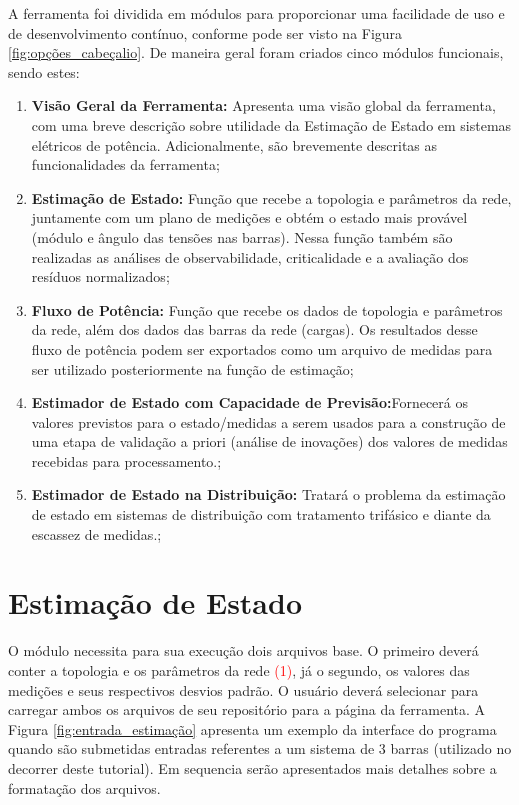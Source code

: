 \documentclass{article}
\begin{document}
A ferramenta foi dividida em módulos para proporcionar uma facilidade de uso e de desenvolvimento contínuo, conforme pode ser visto na Figura \ref{fig:opções_cabeçalio}. De maneira geral foram criados cinco módulos funcionais, sendo estes:
\begin{enumerate}
    \item \textbf{Visão Geral da Ferramenta:} Apresenta uma visão global da ferramenta, com uma breve descrição sobre utilidade da Estimação de Estado em sistemas elétricos de potência. Adicionalmente, são brevemente descritas as funcionalidades da ferramenta;
    \item \textbf{Estimação de Estado:} Função que recebe a topologia e parâmetros da rede, juntamente com um plano de medições e obtém o estado mais provável (módulo e ângulo das tensões nas barras). Nessa função também são realizadas as análises de observabilidade, criticalidade e a avaliação dos resíduos normalizados;
    \item \textbf{Fluxo de Potência:} Função que recebe os dados de topologia e parâmetros da rede, além dos dados das barras da rede (cargas). Os resultados desse fluxo de potência podem ser exportados como um arquivo de medidas para ser utilizado posteriormente na função de estimação;
    \item \textbf{Estimador de Estado com Capacidade de Previsão:}Fornecerá os valores previstos para o estado/medidas a serem usados para a construção de uma etapa de validação a priori (análise de inovações) dos valores de medidas recebidas para processamento.;
    \item \textbf{Estimador de Estado na Distribuição:} Tratará o problema da estimação de estado em sistemas de distribuição com tratamento trifásico e diante da escassez de medidas.;
\end{enumerate}


\section{Estimação de Estado}

O módulo  necessita para sua execução  dois arquivos base. O primeiro deverá conter a topologia e os parâmetros da rede \textcolor{red}{(1)}, já o segundo, os valores das medições e seus respectivos desvios padrão. 
O usuário deverá selecionar \say{\textcolor{blue}{Arraste ou Selecione o Arquivo}} para carregar ambos os arquivos de seu repositório para a página da ferramenta. 
 A Figura \ref{fig:entrada_estimação} apresenta um exemplo da interface do programa quando são submetidas entradas referentes a um sistema de 3 barras (utilizado no decorrer deste tutorial).
 Em sequencia serão apresentados mais detalhes sobre a formatação dos arquivos.
\end{document}
